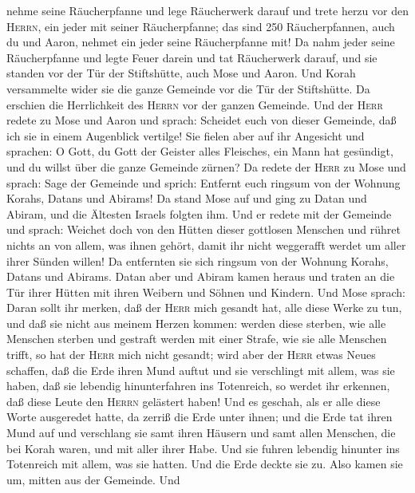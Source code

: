 nehme seine Räucherpfanne und lege Räucherwerk darauf und trete herzu
vor den \textsc{Herrn}, ein jeder mit seiner Räucherpfanne; das sind 250
Räucherpfannen, auch du und Aaron, nehmet ein jeder seine Räucherpfanne
mit!  Da nahm jeder seine Räucherpfanne und legte Feuer
darein und tat Räucherwerk darauf, und sie standen vor der Tür der
Stiftshütte, auch Mose und Aaron.  Und Korah versammelte
wider sie die ganze Gemeinde vor die Tür der Stiftshütte. Da erschien
die Herrlichkeit des \textsc{Herrn} vor der ganzen Gemeinde.
 Und der \textsc{Herr} redete zu Mose und Aaron und
sprach:  Scheidet euch von dieser Gemeinde, daß ich sie
in einem Augenblick vertilge!  Sie fielen aber auf ihr
Angesicht und sprachen: O Gott, du Gott der Geister alles Fleisches, ein
Mann hat gesündigt, und du willst über die ganze Gemeinde zürnen?
 Da redete der \textsc{Herr} zu Mose und sprach:
 Sage der Gemeinde und sprich: Entfernt euch ringsum von
der Wohnung Korahs, Datans und Abirams!  Da stand Mose
auf und ging zu Datan und Abiram, und die Ältesten Israels folgten ihm.
 Und er redete mit der Gemeinde und sprach: Weichet doch
von den Hütten dieser gottlosen Menschen und rühret nichts an von allem,
was ihnen gehört, damit ihr nicht weggerafft werdet um aller ihrer
Sünden willen!  Da entfernten sie sich ringsum von der
Wohnung Korahs, Datans und Abirams. Datan aber und Abiram kamen heraus
und traten an die Tür ihrer Hütten mit ihren Weibern und Söhnen und
Kindern.  Und Mose sprach: Daran sollt ihr merken, daß
der \textsc{Herr} mich gesandt hat, alle diese Werke zu tun, und daß sie
nicht aus meinem Herzen kommen:  werden diese sterben,
wie alle Menschen sterben und gestraft werden mit einer Strafe, wie sie
alle Menschen trifft, so hat der \textsc{Herr} mich nicht gesandt;
 wird aber der \textsc{Herr} etwas Neues schaffen, daß
die Erde ihren Mund auftut und sie verschlingt mit allem, was sie haben,
daß sie lebendig hinunterfahren ins Totenreich, so werdet ihr erkennen,
daß diese Leute den \textsc{Herrn} gelästert haben!  Und
es geschah, als er alle diese Worte ausgeredet hatte, da zerriß die Erde
unter ihnen;  und die Erde tat ihren Mund auf und
verschlang sie samt ihren Häusern und samt allen Menschen, die bei Korah
waren, und mit aller ihrer Habe.  Und sie fuhren lebendig
hinunter ins Totenreich mit allem, was sie hatten. Und die Erde deckte
sie zu. Also kamen sie um, mitten aus der Gemeinde.  Und
